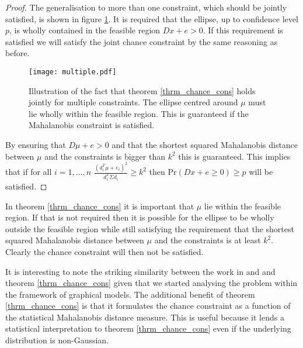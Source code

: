 \begin{proof}
The generalisation to more than one constraint, which should be jointly satisfied, is shown in figure \ref{fig_mahala_ellipse_joint}. It is required that the ellipse, up to confidence level $p$, is wholly contained in the feasible region $Dx +e >0$. If this requirement is satisfied we will satisfy the joint chance constraint by the same reasoning as before.  
\begin{figure}[H] 
\centering
\texttt{[image: multiple.pdf]}
\caption{Illustration of the fact that theorem \ref{thrm_chance_cons} holds jointly for multiple constraints. The ellipse centred around $\mu$ must lie wholly within the feasible region. This is guaranteed if the Mahalanobis constraint is satisfied.}
\label{fig_mahala_ellipse_joint}
\end{figure}
By ensuring that $D\mu + e > 0$ and that the shortest squared Mahalanobis distance between $\mu$ and the constraints is bigger than $k^2$ this is guaranteed. This implies that if for all $i=1,\hdots,n$ $\frac{(d^T_i\mu+e_i)^2}{d_i^T \Sigma d_i} \geq k^2$ then $\text{Pr}(Dx + e \geq 0) \geq p$ will be satisfied.
\end{proof}
In theorem \ref{thrm_chance_cons} it is important that $\mu$ lie within the feasible region. If that is not required then it is possible for the ellipse to be wholly outside the feasible region while still satisfying the requirement that the shortest squared Mahalanobis distance between $\mu$ and the constraints is at least $k^2$. Clearly the chance constraint will then not be satisfied. 

It is interesting to note the striking similarity between the work in \cite{vanhessem1} and \cite{vanhessem2} and theorem \ref{thrm_chance_cons} given that we started analysing the problem within the framework of graphical models. The additional benefit of theorem \ref{thrm_chance_cons} is that it formulates the chance constraint as a function of the statistical Mahalanobis distance measure. This is useful because it lends a statistical interpretation to theorem \ref{thrm_chance_cons} even if the underlying distribution is non-Gaussian.

